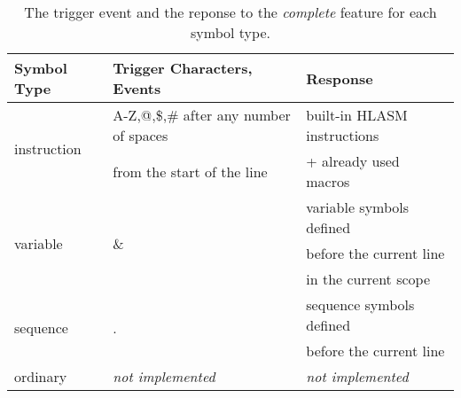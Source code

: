 \begin{table}[h]
	\centering
	\begin{tabular}{lll}
		\toprule
		\textbf{Symbol Type}            & \textbf{Trigger Characters, Events}     & \textbf{Response}  \\ \midrule
		\multirow{2}{3cm}{instruction}  &  A-Z,@,\$,\# after any number of spaces & built-in HLASM instructions\\ 
	                                   	& from the start of the line              & + already used macros     \\ \midrule
		\multirow{3}{3cm}{variable}     & \multirow{3}{4cm}{\&}                   & variable symbols defined \\ 
	 	                                &                                         & before the current line  \\ 
	 	                                &                                         & in the current scope \\ \midrule
		\multirow{2}{3cm}{sequence}     & \multirow{2}{4cm}{.}                    & sequence symbols defined \\ 
										&                                         & before the current line  \\ \midrule
		ordinary                        & \textit{not implemented}                & \textit{not implemented} \\
		\bottomrule
	\end{tabular}
	\caption{The trigger event and the reponse to the \emph{complete} feature for each symbol type.}
\end{table}




